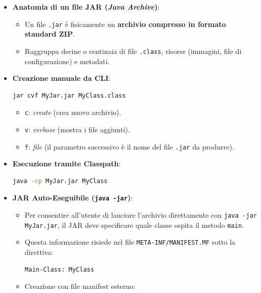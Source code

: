 \documentclass[11pt,a4paper,oneside]{report}
\newcommand{\passthrough}[1]{#1}
\providecommand{\tightlist}{\setlength{\itemsep}{0pt}\setlength{\parskip}{0pt}}
\begin{document}
\begin{itemize}
\item
  \textbf{Anatomia di un file JAR (\emph{Java Archive})}:

  \begin{itemize}
  \tightlist
  \item
    Un file \passthrough{\lstinline!.jar!} è fisicamente un
    \textbf{archivio compresso in formato standard ZIP}.
  \item
    Raggruppa decine o centinaia di file
    \passthrough{\lstinline!.class!}, risorse (immagini, file di
    configurazione) e metadati.
  \end{itemize}
\item
  \textbf{Creazione manuale da CLI}:

\begin{lstlisting}[language=bash]
jar cvf MyJar.jar MyClass.class
\end{lstlisting}

  \begin{itemize}
  \tightlist
  \item
    \passthrough{\lstinline!c!}: \emph{create} (crea nuovo archivio).
  \item
    \passthrough{\lstinline!v!}: \emph{verbose} (mostra i file
    aggiunti).
  \item
    \passthrough{\lstinline!f!}: \emph{file} (il parametro successivo è
    il nome del file \passthrough{\lstinline!.jar!} da produrre).
  \end{itemize}
\item
  \textbf{Esecuzione tramite Classpath}:

\begin{lstlisting}[language=bash]
java -cp MyJar.jar MyClass
\end{lstlisting}
\item
  \textbf{JAR Auto-Eseguibile (\passthrough{\lstinline!java -jar!})}:

  \begin{itemize}
  \item
    Per consentire all'utente di lanciare l'archivio direttamente con
    \passthrough{\lstinline!java -jar MyJar.jar!}, il JAR deve
    specificare quale classe ospita il metodo
    \passthrough{\lstinline!main!}.
  \item
    Questa informazione risiede nel file
    \passthrough{\lstinline!META-INF/MANIFEST.MF!} sotto la direttiva:

\begin{lstlisting}
Main-Class: MyClass
\end{lstlisting}
  \item
    Creazione con file manifest esterno:


\end{itemize}
\end{itemize}
\end{document}
